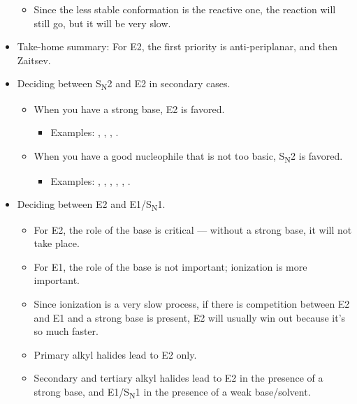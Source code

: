 \documentclass[../notes.tex]{subfiles}
\begin{document}
\begin{itemize}
    \begin{itemize}
        \item Since the less stable conformation is the reactive one, the reaction will still go, but it will be very slow.
    \end{itemize}
    \item Take-home summary: For E2, the first priority is anti-periplanar, and then Zaitsev.
    \item {}Deciding between S\textsubscript{N}2 and E2 in secondary cases.
    \begin{itemize}
        \item When you have a strong base, E2 is favored.
        \begin{itemize}
            \item Examples: , , , .
        \end{itemize}
        \item When you have a good nucleophile that is not too basic, S\textsubscript{N}2 is favored.
        \begin{itemize}
            \item Examples: , , , , , .
        \end{itemize}
    \end{itemize}
    \item Deciding between E2 and E1/S\textsubscript{N}1.
    \begin{itemize}
        \item For E2, the role of the base is critical --- without a strong base, it will not take place.
        \item For E1, the role of the base is not important; ionization is more important.
        \item Since ionization is a very slow process, if there is competition between E2 and E1 and a strong base is present, E2 will usually win out because it's so much faster.
        \item Primary alkyl halides lead to E2 only.
        \item Secondary and tertiary alkyl halides lead to E2 in the presence of a strong base, and E1/S\textsubscript{N}1 in the presence of a weak base/solvent.
    \end{itemize}
\end{itemize}
\end{document}
